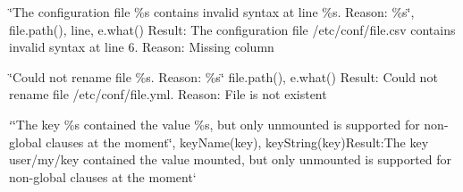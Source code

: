 \begin{DoxyItemize}
\item {\ttfamily \char`\"{}\+The configuration file \%s contains invalid syntax at line \%s. Reason\+: \%s\char`\"{}, file.\+path(), line, e.\+what()} Result\+: {\ttfamily The configuration file /etc/conf/file.csv contains invalid syntax at line 6. Reason\+: Missing column}
\item {\ttfamily \char`\"{}\+Could not rename file \%s. Reason\+: \%s\char`\"{} file.\+path(), e.\+what()} Result\+: {\ttfamily Could not rename file /etc/conf/file.yml. Reason\+: File is not existent}
\item `\char`\"{}\+The key \%s contained the value \textquotesingle{}\%s\textquotesingle{}, but only \textquotesingle{}unmounted\textquotesingle{} is supported for non-\/global clauses at the moment\char`\"{}, key\+Name(key), key\+String(key){\ttfamily  Result\+:}The key user/my/key contained the value \textquotesingle{}mounted\textquotesingle{}, but only \textquotesingle{}unmounted\textquotesingle{} is supported for non-\/global clauses at the moment` 
\end{DoxyItemize}